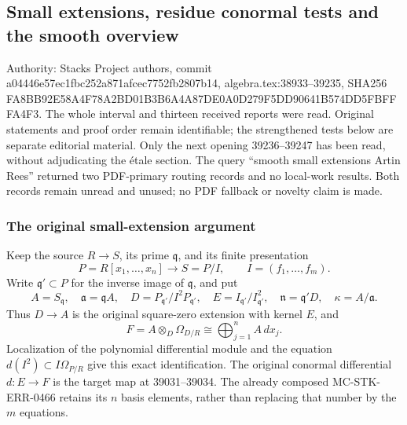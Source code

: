 \subsection{Small extensions, residue conormal tests and the smooth overview}\label{algebra-proof-050-small-extensions-residue-conormal-tests-and-the-smooth-overview}

Authority: Stacks Project authors, commit a044\allowbreak{}46e5\allowbreak{}7ec1\allowbreak{}fbc2\allowbreak{}52a8\allowbreak{}71af\allowbreak{}cec7\allowbreak{}752f\allowbreak{}b280\allowbreak{}7b14, algebra.tex:38933--39235, SHA256 FA8B\allowbreak{}B92E\allowbreak{}58A4\allowbreak{}F78A\allowbreak{}2BD0\allowbreak{}1B3B\allowbreak{}6A4A\allowbreak{}87DE\allowbreak{}0A0D\allowbreak{}279F\allowbreak{}5DD9\allowbreak{}0641\allowbreak{}B574\allowbreak{}DD5F\allowbreak{}BFFF\allowbreak{}A4F3. The whole interval and thirteen received reports were read. Original statements and proof order remain identifiable; the strengthened tests below are separate editorial material. Only the next opening 39236--39247 has been read, without adjudicating the étale section. The query ``smooth small extensions Artin Rees'' returned two PDF-primary routing records and no local-work results. Both records remain unread and unused; no PDF fallback or novelty claim is made.

\subsubsection{The original small-extension argument}\label{algebra-proof-050-the-original-small-extension-argument}

Keep the source \(R\to S\), its prime \(\mathfrak q\), and its finite presentation \[
P=R[x_1,\ldots,x_n]\longrightarrow S=P/I,\qquad
I=(f_1,\ldots,f_m).
\] Write \(\mathfrak q'\subset P\) for the inverse image of \(\mathfrak q\), and put \[
A=S_{\mathfrak q},\quad \mathfrak a=\mathfrak q A,\quad
D=P_{\mathfrak q'}/I^2P_{\mathfrak q'},\quad
E=I_{\mathfrak q'}/I_{\mathfrak q'}^2,\quad
\mathfrak n=\mathfrak q'D,\quad \kappa=A/\mathfrak a.
\] Thus \(D\to A\) is the original square-zero extension with kernel \(E\), and \[
F=A\otimes_D\Omega_{D/R}\cong
\bigoplus_{j=1}^n A\,dx_j.
\] Localization of the polynomial differential module and the equation \(d(I^2)\subset I\Omega_{P/R}\) give this exact identification. The original conormal differential \(d:E\to F\) is the target map at 39031--39034. The already composed MC-STK-ERR-0466 retains its \(n\) basis elements, rather than replacing that number by the \(m\) equations.

